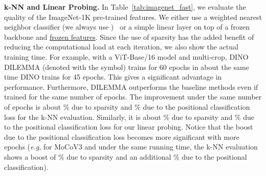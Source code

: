 \documentclass[letterpaper]{article} \usepackage{aaai23}  \usepackage{times}  \usepackage{helvet}  \usepackage{courier}  \usepackage[hyphens]{url}  \usepackage{graphicx} \urlstyle{rm} \def\UrlFont{\rm}  \usepackage{natbib}  \usepackage{caption} \frenchspacing  \setlength{\pdfpagewidth}{8.5in}  \setlength{\pdfpageheight}{11in}  \usepackage{algorithm}
\newcommand{\methodname}{DILEMMA}
\begin{document}
\noindent\textbf{k-NN and Linear Probing.}
In Table~\ref{tab:imagenet_fast}, we evaluate the quality of the ImageNet-1K pre-trained features. We either use a weighted  nearest neighbor classifier (we always use )~\cite{Wu2018UnsupervisedFL} or a simple linear layer on top of a frozen backbone and \underline{frozen features}.
Since the use of sparsity has the added benefit of reducing the computational load at each iteration, we also show the actual training time. For example, with a ViT-Base/16 model and multi-crop, DINO  {\methodname} (denoted with the  symbol) trains for 60 epochs in about the same time DINO trains for 45 epochs. This gives a significant advantage in performance. Furthermore, {\methodname} outperforms the baseline methods even if trained for the same number of epochs. The improvement under the same number of epochs is about \% due to sparsity and \% due to the positional classification loss for the k-NN evaluation. Similarly, it is about \% due to sparsity and \% due to the positional classification loss for our linear probing. Notice that the boost due to the positional classification loss becomes more significant with more epochs (\emph{e.g}, for MoCoV3 and under the same running time, the k-NN evaluation shows a boost of \% due to sparsity and an additional \% due to the positional classification).
\end{document}
